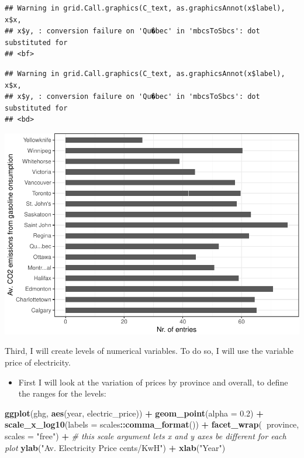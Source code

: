 \documentclass[]{article}
\newenvironment{Shaded}{\begin{snugshade}}{\end{snugshade}}
\newcommand{\CommentTok}[1]{\textcolor[rgb]{0.56,0.35,0.01}{\textit{#1}}}
\newcommand{\DataTypeTok}[1]{\textcolor[rgb]{0.13,0.29,0.53}{#1}}
\newcommand{\FloatTok}[1]{\textcolor[rgb]{0.00,0.00,0.81}{#1}}
\newcommand{\KeywordTok}[1]{\textcolor[rgb]{0.13,0.29,0.53}{\textbf{#1}}}
\newcommand{\NormalTok}[1]{#1}
\newcommand{\OperatorTok}[1]{\textcolor[rgb]{0.81,0.36,0.00}{\textbf{#1}}}
\newcommand{\StringTok}[1]{\textcolor[rgb]{0.31,0.60,0.02}{#1}}
\providecommand{\tightlist}{%
  \setlength{\itemsep}{0pt}\setlength{\parskip}{0pt}}
\begin{document}
\begin{verbatim}
## Warning in grid.Call.graphics(C_text, as.graphicsAnnot(x$label), x$x,
## x$y, : conversion failure on 'Qu�bec' in 'mbcsToSbcs': dot substituted for
## <bf>
\end{verbatim}

\begin{verbatim}
## Warning in grid.Call.graphics(C_text, as.graphicsAnnot(x$label), x$x,
## x$y, : conversion failure on 'Qu�bec' in 'mbcsToSbcs': dot substituted for
## <bd>
\end{verbatim}

\includegraphics{hw05_files/figure-latex/unnamed-chunk-6-1.pdf}

Third, I will create levels of numerical variables. To do so, I will use
the variable price of electricity.

\begin{itemize}
\tightlist
\item
  First I will look at the variation of prices by province and overall,
  to define the ranges for the levels:
\end{itemize}

\begin{Shaded}
\begin{Highlighting}[]
\KeywordTok{ggplot}\NormalTok{(ghg, }\KeywordTok{aes}\NormalTok{(year, electric_price)) }\OperatorTok{+}
\StringTok{  }\KeywordTok{geom_point}\NormalTok{(}\DataTypeTok{alpha =} \FloatTok{0.2}\NormalTok{) }\OperatorTok{+}
\StringTok{  }\KeywordTok{scale_x_log10}\NormalTok{(}\DataTypeTok{labels =}\NormalTok{ scales}\OperatorTok{::}\KeywordTok{comma_format}\NormalTok{()) }\OperatorTok{+}
\StringTok{  }\KeywordTok{facet_wrap}\NormalTok{(}\OperatorTok{~}\NormalTok{province, }\DataTypeTok{scales =} \StringTok{"free"}\NormalTok{) }\OperatorTok{+}\StringTok{ }\CommentTok{# this scale argument lets x and y axes be different for each plot}
\StringTok{   }\KeywordTok{ylab}\NormalTok{(}\StringTok{"Av. Electricity Price cents/KwH"}\NormalTok{) }\OperatorTok{+}\StringTok{ }\KeywordTok{xlab}\NormalTok{(}\StringTok{"Year"}\NormalTok{)}
\end{Highlighting}
\end{Shaded}
\end{document}
